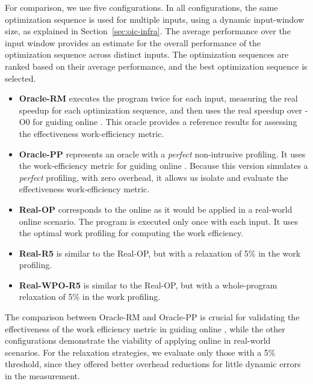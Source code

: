 For comparison, we use five configurations.
In all configurations, the same optimization sequence is used for multiple inputs, using a dynamic input-window size, as explained in Section~\ref{sec:oic-infra}.
The average performance over the input window provides an estimate for the overall performance of the optimization sequence across distinct inputs.
The optimization sequences are ranked based on their average performance, and the best optimization sequence is selected.
\begin{itemize}[leftmargin=3mm]
\item \textbf{Oracle-RM} executes the program twice for each input, measuring the real speedup for each optimization sequence, and then uses the real speedup over {\flagstype -O0} for guiding online {\itercomp}. This oracle provides a reference results for assessing the effectiveness work-efficiency metric.
\item \textbf{Oracle-PP} represents an oracle with a \textit{perfect} non-intrusive profiling.
  It uses the work-efficiency metric for guiding online {\itercomp}.
  Because this version simulates a \textit{perfect} profiling, with zero overhead,
  it allows us isolate and evaluate the effectiveness work-efficiency metric.
\item \textbf{Real-OP} corresponds to the online {\itercomp} as it would be applied in a real-world online scenario.
  The program is executed only once with each input.
  It uses the optimal work profiling for computing the work efficiency.
\item \textbf{Real-R5} is similar to the {Real-OP}, but with a relaxation of 5\% in the work profiling.
\item \textbf{Real-WPO-R5} is similar to the {Real-OP}, but with a whole-program relaxation of 5\% in the work profiling.
\end{itemize}

The comparison between Oracle-RM and Oracle-PP is crucial for validating the
effectiveness of the work efficiency metric in guiding online {\itercomp},
while the other configurations demonstrate the viability of applying online
{\itercomp} in real-world scenarios.
For the relaxation strategies, we evaluate only those with a 5\% threshold, since
they offered better overhead reductions for little dynamic errors in the measurement.


